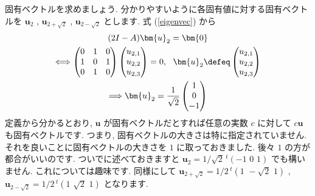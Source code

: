 \documentclass[openany, a4paper, oneside]{jsbook}
\begin{document}
固有ベクトルを求めましょう. 分かりやすいように各固有値に対する固有ベクトルを
 $\bm{u}_{2}$ ,  $\bm{u}_{2 + \sqrt{2}}$ ,  $\bm{u}_{2 - \sqrt{2}}$ とします.
式 (\ref{eigenvec}) から
\begin{gather}
    (2 I - A )\bm{u}_{2} = \bm{0} \\
    \Longleftrightarrow
    \begin{pmatrix} 0 & 1 & 0 \\
                    1 & 0 & 1 \\
                    0 & 1 & 0
    \end{pmatrix}
    \begin{pmatrix} u_{2,1} \\ u_{2,2} \\ u_{2,3} \end{pmatrix}
    = 0 ,\,\,\,\, \bm{u}_{2} \defeq \begin{pmatrix} u_{2,1} \\ u_{2,2} \\ u_{2,3} \end{pmatrix} \\
    \Longrightarrow
    \bm{u}_{2}
    =
    \frac{1}{\sqrt{2}} \begin{pmatrix} 1 \\ 0 \\ -1 \end{pmatrix}
\end{gather}
定義から分かるとおり,  $\bm{u}$ が固有ベクトルだとすれば任意の実数 $c$ に対して $c \bm{u}$ も固有ベクトルです.
つまり, 固有ベクトルの大きさは特に指定されていません. それを良いことに固有ベクトルの大きさを $1$ に取っておきました.
後々 $1$ の方が都合がいいのです. ついでに述べておきますと $\bm{u}_{2} = 1/\sqrt{2} \, ^{t}( -1 \,\, 0 \,\, 1)$ でも構いません.
これについては趣味です. 同様にして $\bm{u}_{2 + \sqrt{2}} = 1/2 \, ^{t}(1 \,\, -\sqrt{2} \,\, 1)$ ,
 $\bm{u}_{2 - \sqrt{2}} = 1/2 \, ^{t}(1 \,\, \sqrt{2} \,\, 1)$ となります.
\end{document}
